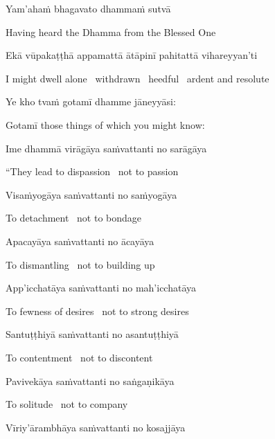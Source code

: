 Yam'ahaṁ bhagavato dhammaṁ sutvā

\begin{english}
  Having heard the Dhamma from the Blessed One
\end{english}

Ekā vūpakaṭṭhā appamattā ātāpinī pahitattā vihareyyan'ti

\begin{english}
  I might dwell alone \breathmark\ withdrawn \breathmark\ heedful \breathmark\ ardent and resolute
\end{english}

Ye kho tvaṁ gotamī dhamme jāneyyāsi:

\begin{english}
  Gotamī those things of which you might know:
\end{english}

Ime dhammā virāgāya saṁvattanti no sarāgāya

\begin{english}
  ``They lead to dispassion \breathmark\ not to passion
\end{english}

Visaṁyogāya saṁvattanti no saṁyogāya

\begin{english}
  To detachment \breathmark\ not to bondage
\end{english}

Apacayāya saṁvattanti no ācayāya

\begin{english}
  To dismantling \breathmark\ not to building up
\end{english}

App'icchatāya saṁvattanti no mah'icchatāya

\begin{english}
  To fewness of desires \breathmark\ not to strong desires
\end{english}

Santuṭṭhiyā saṁvattanti no asantuṭṭhiyā

\begin{english}
  To contentment \breathmark\ not to discontent
\end{english}

Pavivekāya saṁvattanti no saṅgaṇikāya

\begin{english}
  To solitude \breathmark\ not to company
\end{english}

Vīriy'ārambhāya saṁvattanti no kosajjāya


